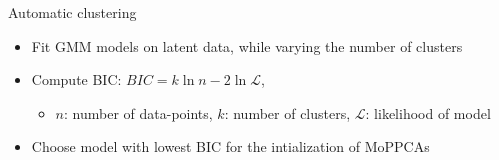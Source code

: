 \documentclass{beamer}
\begin{document}




\begin{frame}{Automatic clustering}
    \begin{itemize}
        \item Fit GMM models on latent data, while varying the number of clusters
        \item Compute BIC: $BIC = k \ln{n} - 2 \ln{\mathcal{L}}$, 
        \begin{itemize}
            \item $n$: number of data-points, $k$: number of clusters, $\mathcal{L}$: likelihood of model
        \end{itemize}
        \item Choose model with lowest BIC for the intialization of MoPPCAs
    \end{itemize}
\end{frame}
\end{document}
